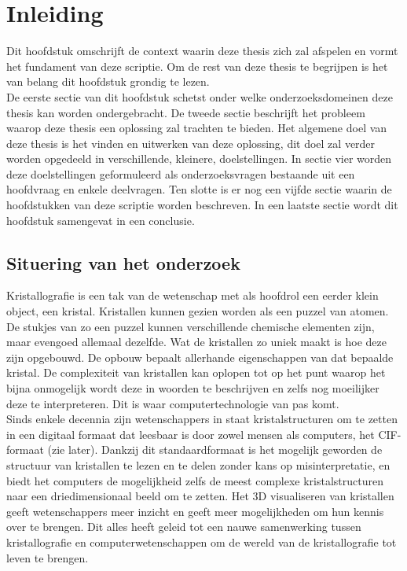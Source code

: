 

\chapter{Inleiding}
Dit hoofdstuk omschrijft de context waarin deze thesis zich zal afspelen en vormt het fundament van deze scriptie. Om de rest van deze thesis te begrijpen is het van belang dit hoofdstuk grondig te lezen. 
\\
De eerste sectie van dit hoofdstuk schetst onder welke onderzoeksdomeinen deze thesis kan worden ondergebracht. De tweede sectie beschrijft het probleem waarop deze thesis een oplossing zal trachten te bieden. Het algemene doel van deze thesis is het vinden en uitwerken van deze oplossing, dit doel zal verder worden opgedeeld in verschillende, kleinere, doelstellingen. In sectie vier worden deze doelstellingen geformuleerd als onderzoeksvragen  bestaande uit een hoofdvraag en enkele deelvragen. Ten slotte is er nog een vijfde sectie waarin de hoofdstukken van deze scriptie worden beschreven. In een laatste sectie wordt dit hoofdstuk samengevat in een conclusie.

\section{Situering van het onderzoek}
Kristallografie is een tak van de wetenschap met als hoofdrol een eerder klein object, een kristal. Kristallen kunnen gezien worden als een puzzel van atomen. De stukjes van zo een puzzel kunnen verschillende chemische elementen zijn, maar evengoed allemaal dezelfde. Wat de kristallen zo uniek maakt is hoe deze zijn opgebouwd. De opbouw bepaalt allerhande eigenschappen van dat bepaalde kristal. De complexiteit van kristallen kan oplopen tot op het punt waarop het bijna onmogelijk wordt deze in woorden te beschrijven en zelfs nog moeilijker deze te interpreteren. Dit is waar computertechnologie van pas komt. 
\\
Sinds enkele decennia zijn wetenschappers in staat kristalstructuren om te zetten in een digitaal formaat dat leesbaar is door zowel mensen als computers, het CIF-formaat (zie later). Dankzij dit standaardformaat is het mogelijk geworden de structuur van kristallen te lezen en te delen zonder kans op misinterpretatie, en biedt het computers de mogelijkheid zelfs de meest complexe kristalstructuren naar een driedimensionaal beeld om te zetten. Het 3D visualiseren van kristallen geeft wetenschappers meer inzicht en geeft meer mogelijkheden om hun kennis over te brengen. Dit alles heeft geleid tot een nauwe samenwerking tussen kristallografie en computerwetenschappen om de wereld van de kristallografie tot leven te brengen.


